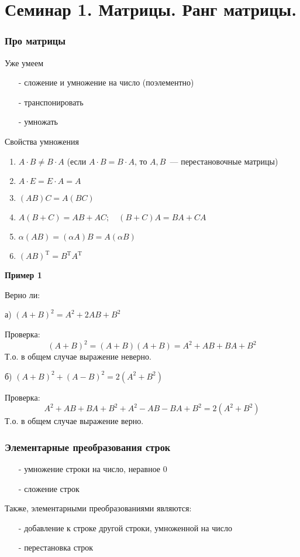\renewcommand{\thepart}{\arabic{part}}
\part{Семинар 1. Матрицы. Ранг матрицы.}
\section{Про матрицы}
Уже умеем
\begin{itemize}
	\item[-] сложение и умножение на число (поэлементно)
	\item[-] транспонировать
	\item[-] умножать
\end{itemize}

Свойства умножения
\renewcommand{\labelenumi}{\arabic{enumi}.\!\degree}
\begin{enumerate}
	\item $A \cdot B \neq B\cdot A$ (если $A \cdot B = B\cdot A$, то $A,B$~--- перестановочные матрицы)
	\item $A\cdot E= E\cdot A = A$
	\item $(AB)C=A(BC)$
	\item $A(B+C)=AB+AC;\quad (B+C)A=BA+CA$
	\item $\alpha (AB)=(\alpha A)B=A(\alpha B)$
	\item $(AB)^\mathrm{T}=B^\mathrm{T}A^\mathrm{T}$
\end{enumerate}
\textbf{Пример 1}

Верно ли:

а) $(A+B)^2=A^2+2AB+B^2$

Проверка:
$$(A+B)^2=(A+B)(A+B)=A^2+AB+BA+B^2$$
Т.о. в общем случае выражение неверно.

б) $(A+B)^2+(A-B)^2=2(A^2+B^2)$

Проверка:
$$A^2+AB+BA+B^2+A^2-AB-BA+B^2=2(A^2+B^2)$$
Т.о. в общем случае выражение верно.
\section{Элементарные преобразования строк}
\begin{itemize}
	\item[-] умножение строки на число, неравное 0
	\item[-] сложение строк
\end{itemize}
Также, элементарными преобразованиями являются:
\begin{itemize}
	\item[-] добавление к строке другой строки, умноженной на число
	\item[-] перестановка строк
\end{itemize}

